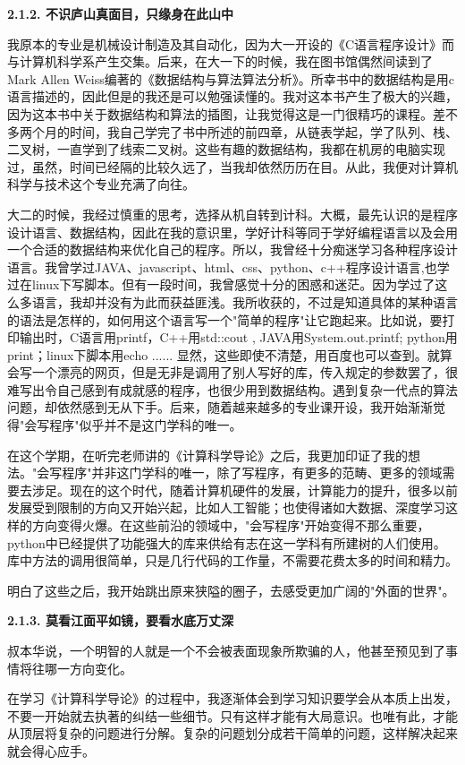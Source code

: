 \documentclass{article}
\begin{document}
\textbf{2.1.2. 不识庐山真面目，只缘身在此山中}\par
我原本的专业是机械设计制造及其自动化，因为大一开设的《C语言程序设计》而与计算机科学系产生交集。后来，在大一下的时候，我在图书馆偶然间读到了Mark Allen Weiss编著的《数据结构与算法算法分析\citep{r7}》。所幸书中的数据结构是用c语言描述的，因此但是的我还是可以勉强读懂的。我对这本书产生了极大的兴趣，因为这本书中关于数据结构和算法的插图，让我觉得这是一门很精巧的课程。差不多两个月的时间，我自己学完了书中所述的前四章，从链表学起，学了队列、栈、二叉树，一直学到了线索二叉树。这些有趣的数据结构，我都在机房的电脑实现过，虽然，时间已经隔的比较久远了，当我却依然历历在目。从此，我便对计算机科学与技术这个专业充满了向往。\par
大二的时候，我经过慎重的思考，选择从机自转到计科。大概，最先认识的是程序设计语言、数据结构，因此在我的意识里，学好计科等同于学好编程语言以及会用一个合适的数据结构来优化自己的程序。所以，我曾经十分痴迷学习各种程序设计语言。我曾学过JAVA、javascript、html、css、python、c++程序设计语言,也学过在linux下写脚本。但有一段时间，我曾感觉十分的困惑和迷茫。因为学过了这么多语言，我却并没有为此而获益匪浅。我所收获的，不过是知道具体的某种语言的语法是怎样的，如何用这个语言写一个"简单的程序"让它跑起来。比如说，要打印输出时，C语言用printf，C++用std::cout , JAVA用System.out.printf; python用print；linux下脚本用echo ......
显然，这些即使不清楚，用百度也可以查到。就算会写一个漂亮的网页，但是无非是调用了别人写好的库，传入规定的参数罢了，很难写出令自己感到有成就感的程序，也很少用到数据结构。遇到复杂一代点的算法问题，却依然感到无从下手。后来，随着越来越多的专业课开设，我开始渐渐觉得"会写程序"似乎并不是这门学科的唯一。\par
在这个学期，在听完老师讲的《计算科学导论》之后，我更加印证了我的想法。"会写程序"并非这门学科的唯一，除了写程序，有更多的范畴、更多的领域需要去涉足。现在的这个时代，随着计算机硬件的发展，计算能力的提升，很多以前发展受到限制的方向又开始兴起，比如人工智能；也使得诸如大数据、深度学习这样的方向变得火爆。在这些前沿的领域中，"会写程序"开始变得不那么重要，python中已经提供了功能强大的库来供给有志在这一学科有所建树的人们使用。库中方法的调用很简单，只是几行代码的工作量，不需要花费太多的时间和精力。\par
明白了这些之后，我开始跳出原来狭隘的圈子，去感受更加广阔的"外面的世界"。\par
\textbf{2.1.3. 莫看江面平如镜，要看水底万丈深}\par
叔本华说，一个明智的人就是一个不会被表面现象所欺骗的人，他甚至预见到了事情将往哪一方向变化。\par
在学习《计算科学导论》的过程中，我逐渐体会到学习知识要学会从本质上出发，不要一开始就去执著的纠结一些细节。只有这样才能有大局意识。也唯有此，才能从顶层将复杂的问题进行分解。复杂的问题划分成若干简单的问题，这样解决起来就会得心应手。\par
\end{document}

